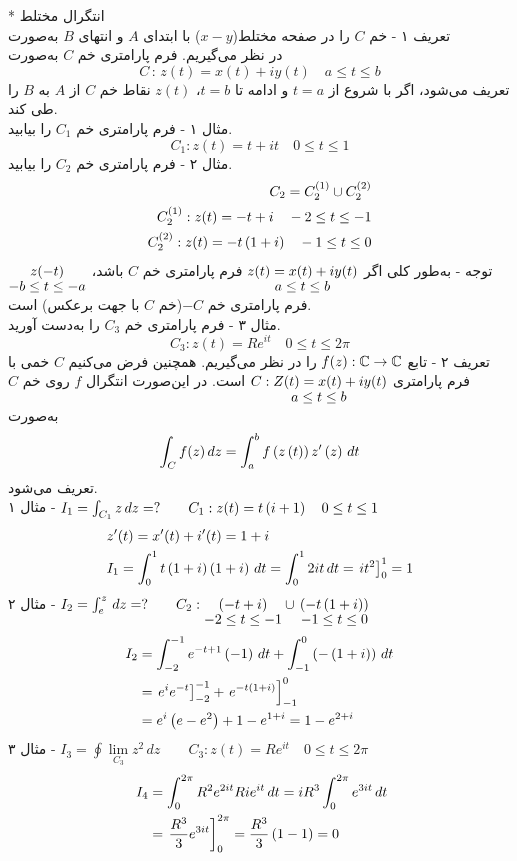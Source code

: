 * انتگرال مختلط\\
تعریف ۱ - خم
$C$
را در صفحه مختلط($x-y$) با ابتدای $A$ و انتهای $B$ به‌صورت\\
در نظر می‌گیریم. فرم پارامتری خم $C$ به‌صورت
\[
C \, : \,  z(t)=x(t)+iy(t) \quad a\le t \le b
\]
تعریف می‌شود، اگر با شروع از
$t=a$
و ادامه تا
$t=b$،
$z(t)$
نقاط خم
$C$
از
$A$
به
$B$
را طی کند.\\
مثال ۱ - فرم پارامتری خم
$C_1$
را بیابید.
\[
C_1 : z(t)=t+it \quad 0\le t\le1
\]
مثال ۲ - فرم پارامتری خم
$C_2$
را بیابید.
\[\begin{aligned}
C_2=C_2^{(1)}\cup C_2^{(2)}\\
C_2^{(1)} : z(t)=-t+i \quad -2\le t\le-1\\
C_2^{(2)} : z(t)=-t\pr{1+i}\quad -1\le t\le0
\end{aligned}\]
توجه - به‌طور کلی اگر
$\myunder{z(t)=x(t)+iy(t)}{a\le t\le b}$
فرم پارامتری خم
$C$
باشد،
$\myunder{z(-t)}{-b\le t\le-a}$
فرم پارامتری خم
$-C$(خم $C$ با جهت برعکس)
است.\\
مثال ۳ - فرم پارامتری خم
$C_3$
را به‌دست آورید.
\[
C_3 : z(t)=Re^{it} \quad 0\le t\le2\pi
\]
تعریف ۲ - تابع
$f(z):\CC\to\CC$
را در نظر می‌گیریم. همچنین فرض می‌کنیم
$C$
خمی با فرم پارامتری
$\myunder{C:Z(t)=x(t)+iy(t)}{a\le t\le b}$
است. در این‌صورت انتگرال
$f$
روی خم
$C$
به‌صورت
\[
\int_C f(z)\,dz=\int_a^bf\pr{z\pr{t}}z^{\prime}\pr{z}\,dt
\]
تعریف می‌شود.\\
مثال ۱ - \hfill
$I_1 = \int_{C_1}z\,dz=? \qquad C_1 : z(t)=t\pr{i+1}\quad 0\le t\le1$
\[\begin{aligned}
	& z^{\prime}(t)=x^\prime(t)+i^\prime(t)=1+i
	\\ &
	I_1=\int_0^1 t\pr{1+i}\pr{1+i}\,dt=\int_0^12it\,dt=\left.{it^2}\right]_0^1=1
\end{aligned}\]
مثال ۲ - \hfill
$I_2=\int_e^z\,dz=?\qquad C_2 : \myunder{\pr{-t+i}}{-2\le t\le-1}\cup\,\myunder{\pr{-t\pr{1+i}}}{-1\le t\le0}$
\[\begin{aligned}
	I_2&=
	\int_{-2}^{-1}e^{-t+1}\pr{-1}\,dt+\int_{-1}^0\pr{-\pr{1+i}}\,dt
	\\ & =
	\left.{e^ie^{-t}}\right]_{-2}^{-1}+\left.{e^{-t\pr{1+i}}}\right]_{-1}^0
	\\ &=
	e^i\pr{e-e^2}+1-e^{1+i}=1-e^{2+i}
\end{aligned}\]
مثال ۳ - \hfill
$I_3=\oint\lim\limits_{C_3}z^2\,dz\qquad C_3 : z(t)=Re^{it} \quad 0\le t\le2\pi$
\[\begin{aligned}\
	I_4 & = \int_0^{2\pi}R^2e^{2it}Rie^{it}\,dt=iR^3\int_0^{2\pi}e^{3it}\,dt
	\\ &=
	\left.{\frac{R^3}3e^{3it}}\right]_0^{2\pi}=\frac{R^3}3\pr{1-1}=0
\end{aligned}\]
